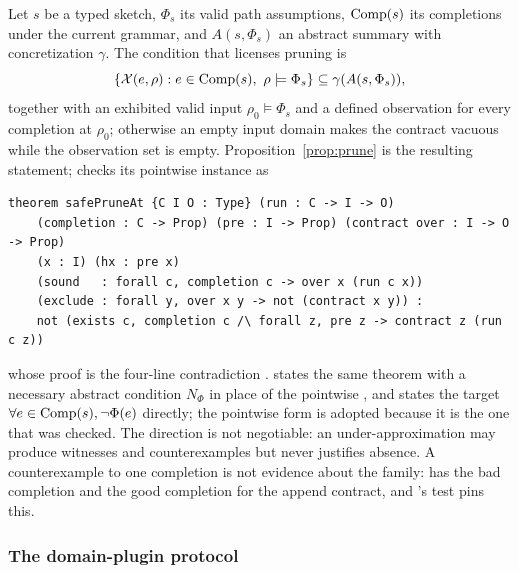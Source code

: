 Let $s$ be a typed sketch, $\Phi_s$ its valid path assumptions, $\mathrm{Comp}(s)$ its completions under the current grammar, and $A(s,\Phi_s)$ an abstract summary with concretization $\gamma$. The condition that licenses pruning is
\[
 \{\Obs(e,\rho): e\in\Comp(s),\ \rho\models\Phi_s\}\subseteq\gamma(A(s,\Phi_s)),
\]
together with an exhibited valid input $\rho_0\models\Phi_s$ and a defined observation for every completion at $\rho_0$; otherwise an empty input domain makes the contract vacuous while the observation set is empty. Proposition~\ref{prop:prune} is the resulting statement;  checks its pointwise instance as
\begin{lstlisting}
theorem safePruneAt {C I O : Type} (run : C -> I -> O)
    (completion : C -> Prop) (pre : I -> Prop) (contract over : I -> O -> Prop)
    (x : I) (hx : pre x)
    (sound   : forall c, completion c -> over x (run c x))
    (exclude : forall y, over x y -> not (contract x y)) :
    not (exists c, completion c /\ forall z, pre z -> contract z (run c z))
\end{lstlisting}
whose proof is the four-line contradiction .  states the same theorem with a necessary abstract condition $N_\Phi$ in place of the pointwise , and  states the target $\forall e\in\mathrm{Comp}(s),\neg\Phi(e)$ directly; the pointwise form is adopted because it is the one that was checked. The direction is not negotiable: an under-approximation may produce witnesses and counterexamples but never justifies absence. A counterexample to one completion is not evidence about the family:  has the bad completion  and the good completion  for the append contract, and 's test  pins this.

\subsubsection{The domain-plugin protocol}

